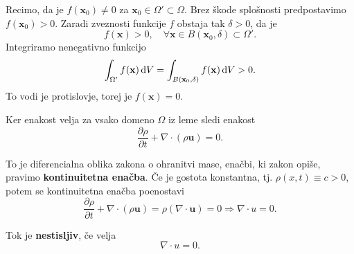 \documentclass[mat2, tisk]{fmfdelo}
\newcommand{\bd}{\textbf}
\begin{document}
\begin{dokaz}
Recimo, da je $f(\bd{x}_0) \neq 0$ za $\bd{x}_0 \in \Omega' \subset \Omega$. Brez škode 
splošnosti predpostavimo $f(\bd{x}_0) > 0$. Zaradi 
zveznosti funkcije $f$ obstaja tak $\delta > 0$, da je 
$$
f(\bd{x}) > 0, \quad \forall \bd{x} \in B(\bd{x}_0, \delta) \subset \Omega'.
$$
Integriramo nenegativno funkcijo 
$$
\int_{\Omega'} f(\bd{x}) \dif V = \int_{B(\bd{x}_0, \delta)} f(\bd{x}) \dif V > 0.
$$
To vodi je protislovje, torej je $f(\bd{x}) = 0$.
\end{dokaz}

Ker enakost velja za vsako domeno $\Omega$ iz leme sledi enakost
\begin{equation}
\frac{\partial \rho}{\partial t} + \nabla \cdot (\rho\bd{u}) = 0.
\end{equation}


To je diferencialna oblika zakona o ohranitvi mase, enačbi, ki zakon opiše, pravimo \textbf{kontinuitetna enačba}.
Če je gostota konstantna, tj. $\rho(x, t) \equiv c > 0$, potem se kontinuitetna enačba poenostavi
$$
\frac{\partial \rho}{\partial t} + \nabla \cdot (\rho\bd{u}) = \rho (\nabla \cdot \bd{u}) = 0 \Longrightarrow \nabla \cdot u = 0.
$$
\begin{definicija}
Tok je \textbf{nestisljiv}, če velja 
\begin{equation}
\label{ohranitev mase}
  \nabla \cdot u = 0.    
\end{equation}
\end{definicija}
\end{document}
